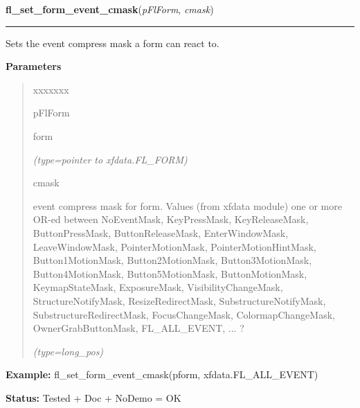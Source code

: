     \vspace{0.5ex}

\hspace{.8\funcindent}\begin{boxedminipage}{\funcwidth}

    \raggedright \textbf{fl\_set\_form\_event\_cmask}(\textit{pFlForm}, \textit{cmask})

    \vspace{-1.5ex}

    \rule{\textwidth}{0.5\fboxrule}
\setlength{\parskip}{2ex}
    Sets the event compress mask a form can react to.

\setlength{\parskip}{1ex}
      \textbf{Parameters}
      \vspace{-1ex}

      \begin{quote}
        \begin{Ventry}{xxxxxxx}

          \item[pFlForm]

          form

            {\it (type=pointer to xfdata.FL\_FORM)}

          \item[cmask]

          event compress mask for form. Values (from xfdata module) one or 
          more OR-ed between NoEventMask, KeyPressMask, KeyReleaseMask, 
          ButtonPressMask, ButtonReleaseMask, EnterWindowMask, 
          LeaveWindowMask, PointerMotionMask, PointerMotionHintMask, 
          Button1MotionMask, Button2MotionMask, Button3MotionMask, 
          Button4MotionMask, Button5MotionMask, ButtonMotionMask, 
          KeymapStateMask, ExposureMask, VisibilityChangeMask, 
          StructureNotifyMask, ResizeRedirectMask, SubstructureNotifyMask, 
          SubstructureRedirectMask, FocusChangeMask, ColormapChangeMask, 
          OwnerGrabButtonMask, FL\_ALL\_EVENT, ... ?

            {\it (type=long\_pos)}

        \end{Ventry}

      \end{quote}

\textbf{Example:} fl\_set\_form\_event\_cmask(pform, xfdata.FL\_ALL\_EVENT)



\textbf{Status:} Tested + Doc + NoDemo = OK



    \end{boxedminipage}

